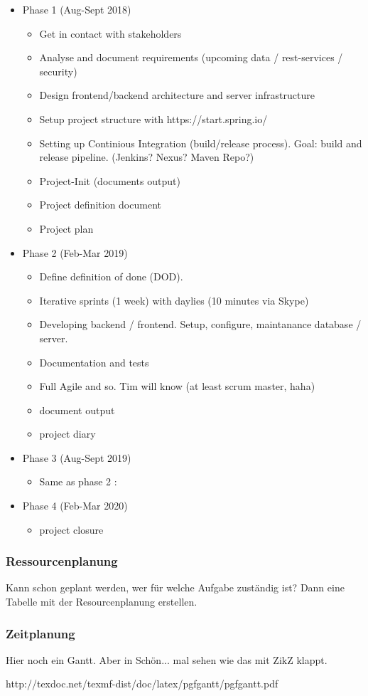 \begin{itemize}
\item Phase 1 (Aug-Sept 2018)
  \begin{itemize}
  \item Get in contact with stakeholders
  \item Analyse and document requirements (upcoming data / rest-services / security)
  \item Design frontend/backend architecture and server infrastructure
  \item Setup project structure with https://start.spring.io/
  \item Setting up Continious Integration (build/release process). Goal: build and release pipeline. (Jenkins? Nexus? Maven Repo?)
  \item Project-Init (documents output)
  \item Project definition document
  \item Project plan
  \end{itemize}

\item Phase 2 (Feb-Mar 2019)
  \begin{itemize}
  \item Define definition of done (DOD).
  \item Iterative sprints (1 week) with daylies (10 minutes via Skype)
  \item Developing backend / frontend. Setup, configure, maintanance database / server.
  \item Documentation and tests
  \item Full Agile and so. Tim will know (at least scrum master, haha)
  \item document output
  \item project diary
  \end{itemize}

\item Phase 3 (Aug-Sept 2019)
  \begin{itemize}
  \item Same as phase 2 :
  \end{itemize}

\item Phase 4 (Feb-Mar 2020)
  \begin{itemize}
  \item project closure
  \end{itemize}
\end{itemize}

\subsubsection{Ressourcenplanung}

Kann schon geplant werden, wer für welche Aufgabe zuständig ist? Dann eine Tabelle mit der Resourcenplanung erstellen.


\subsubsection{Zeitplanung}

Hier noch ein Gantt. Aber in Schön... mal sehen wie das mit ZikZ klappt.

http://texdoc.net/texmf-dist/doc/latex/pgfgantt/pgfgantt.pdf